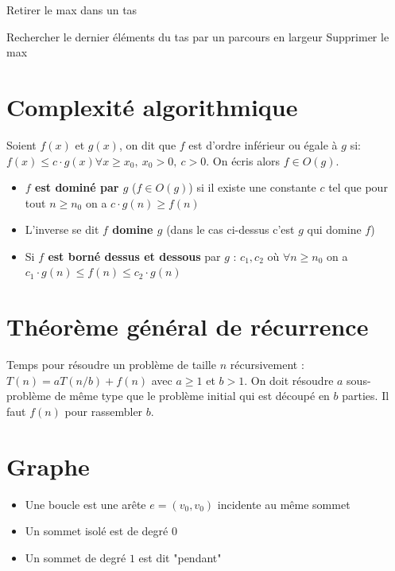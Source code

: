 \documentclass[11pt,a4paper]{report}
\begin{document}
\begin{algorithm}[H]
\caption{Retirer le max dans un tas}
Rechercher le dernier éléments du tas par un parcours en largeur\;
Supprimer le max\;
\end{algorithm}

\section{Complexité algorithmique}

Soient $f(x)$ et $g(x)$, on dit que $f$ est d'ordre inférieur ou égale à $g$ si: $f(x) \leq c\cdot g(x) \forall x \geq x_0,\ x_0>0,\ c > 0$. On écris alors $f\in O(g)$.
\begin{itemize}
    \item \textbf{$f$ est dominé par $g$} ($f\in O(g)$) si il existe une constante $c$ tel que pour tout $n\geq n_0$ on a $c\cdot g(n) \geq f(n)$
    \item L'inverse se dit \textbf{$f$ domine $g$} (dans le cas ci-dessus c'est $g$ qui domine $f$)
    \item Si \textbf{$f$ est borné dessus \textbf{et} dessous} par $g$ : $c_1,c_2$ où $\forall n \geq n_0$ on a $c_1\cdot g(n) \leq f(n) \leq c_2 \cdot g(n)$
\end{itemize}

\section{Théorème général de récurrence}
Temps pour résoudre un problème de taille $n$ récursivement : $T(n) = aT(n/b) + f(n)$ avec $a\geq 1$ et $b > 1$. On doit résoudre $a$ sous-problème de même type que le problème initial qui est découpé en $b$ parties. Il faut $f(n)$ pour rassembler $b$.

\section{Graphe}

\begin{itemize}
    \item Une boucle est une arête $e=(v_0,v_0)$ incidente au même sommet
    \item Un sommet isolé est de degré $0$
    \item Un sommet de degré $1$ est dit "pendant"
\end{itemize}
\end{document}
